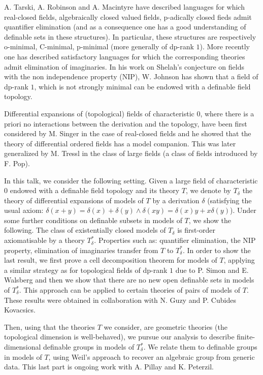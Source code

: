 \documentclass[bsl,meeting]{asl}
\begin{document}
\thispagestyle{empty}






\par  A. Tarski, A. Robinson and A. Macintyre have described languages for which real-closed fields, algebraically closed valued fields, p-adically closed fieds admit quantifier elimination (and as a consequence one has a good understanding of definable sets in these structures). In particular, these structures are respectively o-minimal, C-minimal, p-minimal (more generally of dp-rank $1$). More recently one has described satisfactory languages for which the corresponding theories admit elimination of imaginaries. 
In his work on Shelah's conjecture on fields with the non independence property (NIP), W. Johnson has shown that a field of dp-rank $1$, which is not strongly minimal can be endowed with a definable field  topology. 
\par Differential expansions of (topological) fields of characteristic $0$, where there is a priori no interactions between the derivation and the topology, have been first considered by  M. Singer in the case of real-closed fields and he showed that the theory of differential ordered fields has a model companion. 
This was later generalized by M. Tressl in the class of large fields (a class of fields introduced by F. Pop). 
\par In this talk, we consider the following setting.
Given a large field of characteristic $0$ endowed with a definable field  topology and its theory $T$, we denote by $T_{\delta}$ the theory of differential expansions of models of $T$ by a derivation $\delta$  (satisfying the usual axiom: $\delta(x+y)=\delta(x)+\delta(y)\wedge \delta(xy)=\delta(x)y+x\delta(y)$). 
Under some further conditions on definable subsets in models of $T$, we show the following.
 The class of existentially closed models of $T_{\delta}$ is first-order axiomatisable by a theory $T_{\delta}^*$. Properties such as: quantifier elimination, the NIP property, elimination of imaginaries transfer from $T$ to $T_\delta^*$. In order to show the last result, we first prove a cell decomposition theorem for models of $T$, applying a similar strategy as for topological fields of dp-rank $1$ due to P. Simon and E. Walsberg and then we show that there are no new open definable sets in models of $T_{\delta}^*$.
This approach can be applied to certain theories of pairs of models of $T$.
 These results were obtained in collaboration with N. Guzy and P. Cubides Kovacsics.
\par Then, using that the theories $T$ we consider, are geometric theories (the topological dimension is well-behaved), 
we pursue our analysis to describe finite-dimensional definable groups in models of $T_{\delta}^{*}$. We relate them to definable groups in models of $T$, using Weil's approach to recover an algebraic group from generic data.
This last part is ongoing work with A. Pillay and K. Peterzil.
\end{document}
